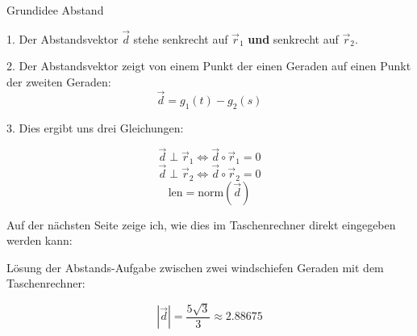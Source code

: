 \begin{rezept}{Grundidee Abstand}{}

  1. Der Abstandsvektor $\vec{d}$ stehe senkrecht auf $\vec{r}_1$
  \textbf{und} senkrecht auf $\vec{r}_2$.

  2. Der Abstandsvektor zeigt von einem Punkt der einen Geraden auf
  einen Punkt der zweiten Geraden: $$\vec{d}=g_1(t)-g_2(s)$$

  3. Dies ergibt uns drei Gleichungen:

  $$\vec{d}\perp\vec{r}_1 \Longleftrightarrow{}  \vec{d}\circ{}\vec{r}_1 = 0$$
  $$\vec{d}\perp\vec{r}_2 \Longleftrightarrow{}  \vec{d}\circ{}\vec{r}_2 = 0$$
  $$\text{len} = \text{norm}(\vec{d})$$
  
\end{rezept}

Auf der nächsten Seite zeige ich, wie dies im Taschenrechner direkt
eingegeben werden kann:
\newpage

Lösung der Abstands-Aufgabe zwischen zwei windschiefen Geraden mit dem
Taschenrechner:


$$|\vec{d}| = \frac{5\sqrt{3}}{3} \approx 2.88675$$
\newpage

